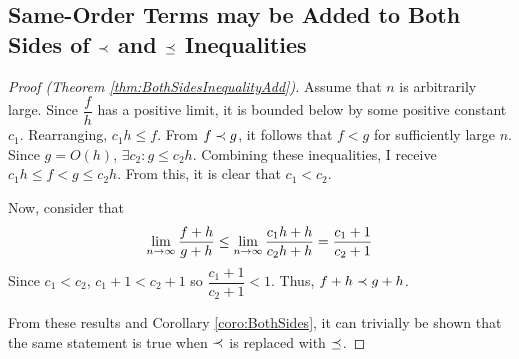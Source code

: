 \subsection{Same-Order Terms may be Added to Both Sides of $\prec$ and $\preceq$ Inequalities}

\begin{proof}[Proof (Theorem \ref{thm:BothSidesInequalityAdd})]
	Assume that $n$ is arbitrarily large. Since $\dfrac{f}{h}$ has a positive limit, it is bounded below by some positive constant $c_1$. Rearranging, $c_1 h \leq f$. From $f \prec g$, it follows that $f < g$ for sufficiently large $n$. Since $g = O(h)$, $\exists c_2 : g \leq c_2 h$. Combining these inequalities, I receive $c_1 h \leq f < g \leq c_2 h$. From this, it is clear that $c_1 < c_2$.
	
	Now, consider that
	\begin{align*}
	\lim_{n \to \infty} \frac{f + h}{g + h} \leq \lim_{n \to \infty} \frac{c_1 h + h}{c_2 h + h} = \frac{c_1 + 1}{c_2 + 1}
	\end{align*}
	Since $c_1 < c_2$, $c_1 + 1 < c_2 + 1$ so $\dfrac{c_1 + 1}{c_2 + 1} < 1$. Thus, $f + h \prec g + h$.
	
	From these results and Corollary \ref{coro:BothSides}, it can trivially be shown that the same statement is true when $\prec$ is replaced with $\preceq$.
\end{proof}